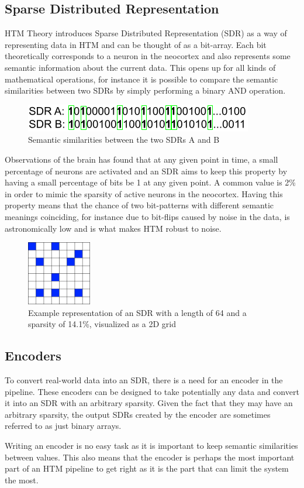 \subsection{Sparse Distributed Representation}
HTM Theory introduces Sparse Distributed Representation (SDR) as a way of representing data in HTM and can be thought of as a bit-array. Each bit theoretically corresponds to a neuron in the neocortex and also represents some semantic information about the current data. This opens up for all kinds of mathematical operations, for instance it is possible to compare the semantic similarities between two SDRs by simply performing a binary AND operation.
\begin{figure}[H]
    \centering
    \includegraphics{resources/related_works/sdr-semantics.png}
    \caption{Semantic similarities between the two SDRs A and B}
    \label{fig:sdr_semantics}
\end{figure}
Observations of the brain has found that at any given point in time, a small percentage of neurons are activated and an SDR aims to keep this property by having a small percentage of bits be 1 at any given point. A common value is 2\% in order to mimic the sparsity of active neurons in the neocortex. Having this property means that the chance of two bit-patterns with different semantic meanings coinciding, for instance due to bit-flips caused by noise in the data, is astronomically low and is what makes HTM robust to noise.
\begin{figure}[H]
    \centering
    \includegraphics[width=0.25\textwidth]{resources/related_works/SDR.png}
    \caption{Example representation of an SDR with a length of 64 and a sparsity of 14.1\%, visualized as a 2D grid}
\end{figure}
\subsection{Encoders}
To convert real-world data into an SDR, there is a need for an encoder in the pipeline. These encoders can be designed to take potentially any data and convert it into an SDR with an arbitrary sparsity. Given the fact that they may have an arbitrary sparsity, the output SDRs created by the encoder are sometimes referred to as just binary arrays.\par
Writing an encoder is no easy task as it is important to keep semantic similarities between values. This also means that the encoder is perhaps the most important part of an HTM pipeline to get right as it is the part that can limit the system the most.\par


